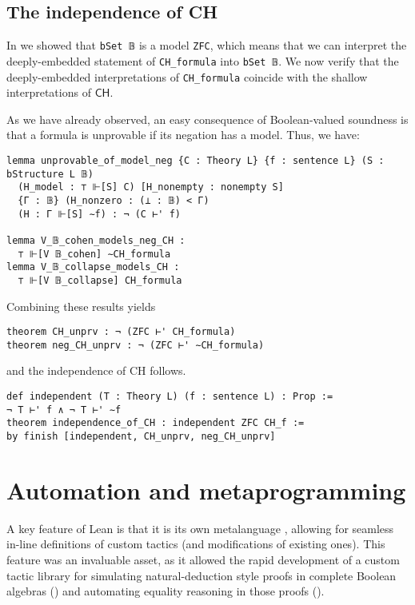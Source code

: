 \documentclass[sigplan,10pt,review, anonymous]{acmart}
\newcommand{\lil}{\lstinline}
\theoremstyle{definition}
\begin{document}


\subsection{The independence of CH} \label{subsect:forcing:independence}

In  we showed that \lil{bSet 𝔹} is a model \lil{ZFC},
which means that we can interpret the deeply-embedded statement of \lil{CH_formula} into
\lil{bSet 𝔹}.
We now verify that the deeply-embedded interpretations of \lil{CH_formula} coincide with the shallow interpretations of \(\mathsf{CH}\).

As we have already observed, an easy consequence of Boolean-valued soundness is that a formula is unprovable if its negation has a model. Thus, we have:
\begin{lstlisting}
lemma unprovable_of_model_neg {C : Theory L} {f : sentence L} (S : bStructure L 𝔹)
  (H_model : ⊤ ⊩[S] C) [H_nonempty : nonempty S]
  {Γ : 𝔹} (H_nonzero : (⊥ : 𝔹) < Γ)
  (H : Γ ⊩[S] ∼f) : ¬ (C ⊢' f)

lemma V_𝔹_cohen_models_neg_CH :
  ⊤ ⊩[V 𝔹_cohen] ∼CH_formula
lemma V_𝔹_collapse_models_CH :
  ⊤ ⊩[V 𝔹_collapse] CH_formula
\end{lstlisting}
\noindent Combining these results yields
\begin{lstlisting}
theorem CH_unprv : ¬ (ZFC ⊢' CH_formula)
theorem neg_CH_unprv : ¬ (ZFC ⊢' ∼CH_formula)
\end{lstlisting}
\noindent and the independence of CH follows.
\begin{lstlisting}
def independent (T : Theory L) (f : sentence L) : Prop :=
¬ T ⊢' f ∧ ¬ T ⊢' ∼f
theorem independence_of_CH : independent ZFC CH_f :=
by finish [independent, CH_unprv, neg_CH_unprv]
\end{lstlisting}
\section{Automation and metaprogramming}
\label{sect:metaprogramming}

A key feature of Lean is that it is its own metalanguage \cite{Ebner:2017:MFF:3136534.3110278}, allowing for seamless in-line definitions of custom tactics (and modifications of existing ones).
This feature was an invaluable asset, as it allowed the rapid development of a custom tactic library for simulating natural-deduction style proofs in complete Boolean algebras () and automating equality reasoning in those proofs ().
\end{document}
